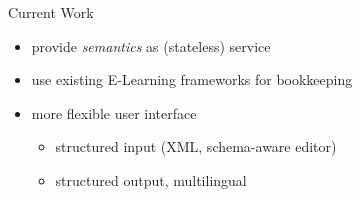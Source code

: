 \begin{slide}{Current Work}

  \begin{itemize}
  \item provide \emph{semantics} as (stateless) service
  \item use existing E-Learning frameworks for bookkeeping
  \item more flexible user interface 
    \begin{itemize}
    \item structured input (XML, schema-aware editor)
    \item structured output, multilingual
    \end{itemize}
  \end{itemize}

\end{slide}
